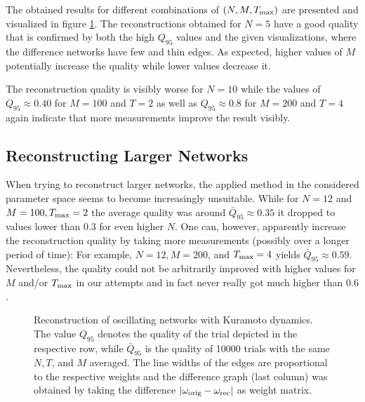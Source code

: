\documentclass{scrartcl}
\begin{document}
The obtained results for different combinations of $(N, M, T_{\mathrm{max}})$ are
presented and visualized in figure \ref{fig:D211}. The reconstructions
obtained for $N = 5$ have a good quality that is confirmed by both the high
$Q_{95}$ values and the given visualizations, where the difference networks
have few and thin edges. As expected, higher values of $M$ potentially
increase the quality while lower values decrease it.

The reconstruction quality is visibly worse for $N = 10$ while the values
of $Q_{95} \approx 0.40$ for $M = 100$ and $T = 2$ as well as
$Q_{95}\approx 0.8$ for $M = 200$ and $T = 4$ again indicate that more
measurements improve the result visibly.


\subsection{Reconstructing Larger Networks}
When trying to reconstruct larger networks, the applied method in the
considered parameter space seems to become increasingly unsuitable. While for
$N=12$ and  $M = 100, T_{\mathrm{max}} = 2$ the average quality was around
$\bar{Q}_{95}\approx 0.35$ it dropped to values lower than $0.3$ for even
higher $N$. One can, however, apparently increase the reconstruction
quality by taking more measurements (possibly over a longer period of
time): For example, $N=12, M=200$, and $T_{\mathrm{max}}=4$ yields
$\bar{Q}_{95}\approx 0.59$. Nevertheless, the quality could not be
arbitrarily improved with higher values for $M$ and/or $T_{\mathrm{max}}$ in our
attempts and in fact never really got much higher than $0.6$.  



\begin{figure}
    \centering
    \def\svgwidth{0.75\textwidth}
    
    \caption{Reconstruction of oscillating networks with Kuramoto dynamics. The
        value $Q_{95}$ denotes the quality of the trial depicted in the
        respective row, while $\bar{Q}_{95}$ is the quality of 10000
        trials with the same $N, T$, and $M$ averaged. The line widths of
        the edges are proportional to the respective weights and the
        difference graph (last column) was obtained by taking the
        difference $|\omega_{\mathrm{orig}} - \omega_{\mathrm{rec}}|$ as weight matrix.}
    \label{fig:D211}
\end{figure}
\end{document}
